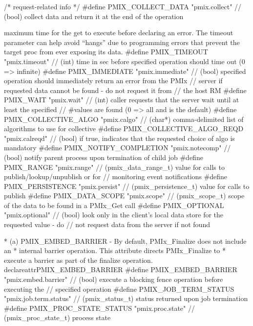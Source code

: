 \begin{codepar}
/* request-related info */
#define PMIX_COLLECT_DATA                   "pmix.collect"          // (bool) collect data and return it at the end of the operation

maximum time for the get to execute before declaring an error.
The timeout parameter can help avoid ``hangs'' due to programming errors that prevent the target proc from ever exposing its data.
#define PMIX_TIMEOUT                        "pmix.timeout"          // (int) time in sec before specified operation should time out (0 => infinite)
#define PMIX_IMMEDIATE                      "pmix.immediate"        // (bool) specified operation should immediately return an error from the PMIx
                                                                    //        server if requested data cannot be found - do not request it from
                                                                    //        the host RM
#define PMIX_WAIT                           "pmix.wait"             // (int) caller requests that the server wait until at least the specified
                                                                    //       #values are found (0 => all and is the default)
#define PMIX_COLLECTIVE_ALGO                "pmix.calgo"            // (char*) comma-delimited list of algorithms to use for collective
#define PMIX_COLLECTIVE_ALGO_REQD           "pmix.calreqd"          // (bool) if true, indicates that the requested choice of algo is mandatory
#define PMIX_NOTIFY_COMPLETION              "pmix.notecomp"         // (bool) notify parent process upon termination of child job
#define PMIX_RANGE                          "pmix.range"            // (pmix_data_range_t) value for calls to publish/lookup/unpublish or for
                                                                    //        monitoring event notifications
#define PMIX_PERSISTENCE                    "pmix.persist"          // (pmix_persistence_t) value for calls to publish
#define PMIX_DATA_SCOPE                     "pmix.scope"            // (pmix_scope_t) scope of the data to be found in a PMIx_Get call
#define PMIX_OPTIONAL                       "pmix.optional"         // (bool) look only in the client's local data store for the requested value - do
                                                                    //        not request data from the server if not found

 * (a) PMIX_EMBED_BARRIER - By default, PMIx_Finalize does not include an
 * internal barrier operation. This attribute directs PMIx_Finalize to
 * execute a barrier as part of the finalize operation.
 declareattr{PMIX_EMBED_BARRIER}
#define PMIX_EMBED_BARRIER                  "pmix.embed.barrier"    // (bool) execute a blocking fence operation before executing the
                                                                    //        specified operation
#define PMIX_JOB_TERM_STATUS                "pmix.job.term.status"  // (pmix_status_t) status returned upon job termination
#define PMIX_PROC_STATE_STATUS              "pmix.proc.state"       // (pmix_proc_state_t) process state


\end{codepar}
